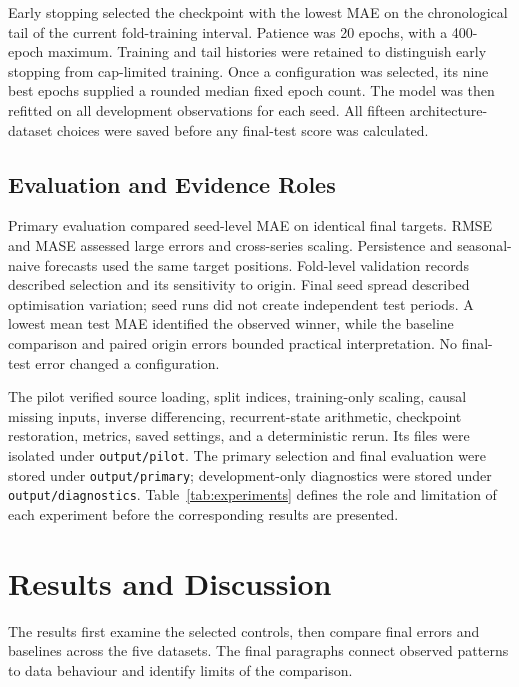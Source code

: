 \documentclass[conference,10pt]{IEEEtran}
\begin{document}
Early stopping selected the checkpoint with the lowest MAE on the chronological tail of the current fold-training interval. Patience was 20 epochs, with a 400-epoch maximum. Training and tail histories were retained to distinguish early stopping from cap-limited training. Once a configuration was selected, its nine best epochs supplied a rounded median fixed epoch count. The model was then refitted on all development observations for each seed. All fifteen architecture-dataset choices were saved before any final-test score was calculated.

\subsection{Evaluation and Evidence Roles}
Primary evaluation compared seed-level MAE on identical final targets. RMSE and MASE assessed large errors and cross-series scaling. Persistence and seasonal-naive forecasts used the same target positions. Fold-level validation records described selection and its sensitivity to origin. Final seed spread described optimisation variation; seed runs did not create independent test periods. A lowest mean test MAE identified the observed winner, while the baseline comparison and paired origin errors bounded practical interpretation. No final-test error changed a configuration.

The pilot verified source loading, split indices, training-only scaling, causal missing inputs, inverse differencing, recurrent-state arithmetic, checkpoint restoration, metrics, saved settings, and a deterministic rerun. Its files were isolated under \texttt{output/pilot}. The primary selection and final evaluation were stored under \texttt{output/primary}; development-only diagnostics were stored under \texttt{output/diagnostics}. Table~\ref{tab:experiments} defines the role and limitation of each experiment before the corresponding results are presented.



\section{Results and Discussion}
The results first examine the selected controls, then compare final errors and baselines across the five datasets. The final paragraphs connect observed patterns to data behaviour and identify limits of the comparison.


\clearpage
\end{document}
